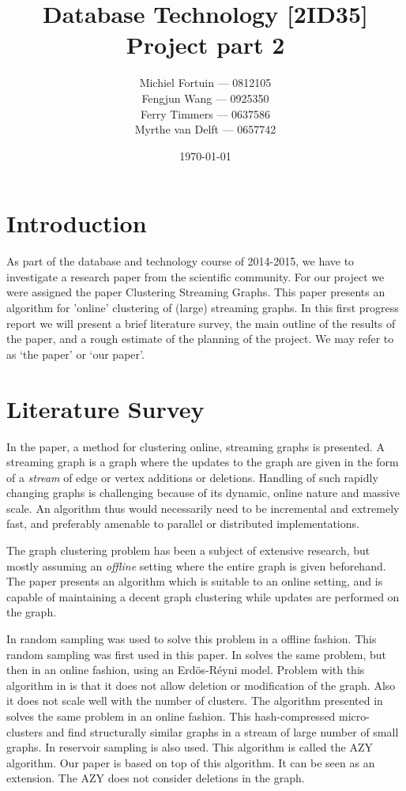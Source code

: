 \documentclass[a4paper,11pt]{article}
\title{Database Technology [2ID35] \\
\textbf{Project part 2}}
\author{
Michiel Fortuin --- 0812105 \\
Fengjun Wang --- 0925350 \\
Ferry Timmers --- 0637586 \\
Myrthe van Delft --- 0657742}
\date{\today}
\begin{document}
\newcommand{\papername}[0]{Clustering Streaming Graphs}

\maketitle

\section{Introduction}
As part of the database and technology course of 2014-2015, we have to investigate a research paper from the scientific community. For our project we were assigned the paper \papername \cite{paper}. This paper presents an algorithm for 'online' clustering of (large) streaming graphs. In this first progress report we will present a brief literature survey, the main outline of the results of the paper, and a rough estimate of the planning of the project. We may refer to \cite{paper} as `the paper' or `our paper'.

\section{Literature Survey}
In the paper, a method for clustering online, streaming graphs is presented. A streaming graph is a graph where the updates to the graph are given in the form of a \textit{stream} of edge or vertex additions or deletions. Handling of such rapidly changing graphs is challenging because of its dynamic, online nature and massive scale. An algorithm thus would necessarily need to be incremental and extremely fast, and preferably amenable to parallel or distributed implementations. 

The graph clustering problem has been a subject of extensive research, but mostly assuming an \textit{offline} setting where the entire graph is given beforehand. The paper presents an algorithm which is suitable to an online setting, and is capable of maintaining a decent graph clustering while updates are performed on the graph. 

In \cite{11} random sampling was used to solve this problem in a offline fashion. This random sampling was first used in this paper. In \cite{12} solves the same problem, but then in an online fashion, using an Erdös-Réyni model. Problem with this algorithm in \cite{12} is that it does not allow deletion or modification of the graph. Also it does not scale well with the number of clusters. The algorithm presented in  \cite{13} solves the same problem in an online fashion. This hash-compressed micro-clusters and find structurally similar graphs in a stream of large number of small graphs. In \cite{14} reservoir sampling is also used. This algorithm is called the AZY algorithm. Our paper is based on top of this algorithm. It can be seen as an extension. The AZY does not consider deletions in the graph.
\end{document}
